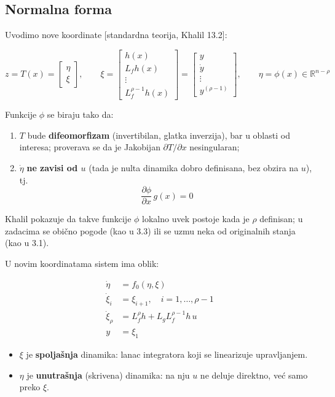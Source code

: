 \documentclass[11pt,a4paper,parskip=half,headsepline,numbers=noenddot]{scrartcl}
\DeclareRobustCommand{\izvor}[1]{{\small\color{izvorC}[#1]}}
\begin{document}
\subsection{Normalna forma}

Uvodimo nove koordinate \izvor{standardna teorija, Khalil 13.2}:

\[z = T(x) = \begin{bmatrix} \eta \\ \xi \end{bmatrix}, \qquad \xi = \begin{bmatrix} h(x) \\ L_fh(x) \\ \vdots \\ L_f^{\rho-1}h(x) \end{bmatrix} = \begin{bmatrix} y \\ \dot y \\ \vdots \\ y^{(\rho-1)} \end{bmatrix}, \qquad \eta = \phi(x) \in \mathbb{R}^{n-\rho}\]

Funkcije \(\phi\) se biraju tako da:

\begin{enumerate}
\def\labelenumi{\arabic{enumi}.}
\item \(T\) bude \textbf{difeomorfizam} (invertibilan, glatka inverzija), bar u oblasti od interesa; proverava se da je Jakobijan \(\partial T/\partial x\) nesingularan;
\item \(\dot\eta\) \textbf{ne zavisi od \(u\)} (tada je nulta dinamika dobro definisana, bez obzira na \(u\)), tj.
  \[\frac{\partial\phi}{\partial x}\,g(x) = 0\]
\end{enumerate}

Khalil pokazuje da takve funkcije \(\phi\) lokalno uvek postoje kada je \(\rho\) definisan; u zadacima se obično pogode (kao u 3.3) ili se uzmu neka od originalnih stanja (kao u 3.1).

U novim koordinatama sistem ima oblik:

\[
\begin{aligned}
\dot\eta &= f_0(\eta, \xi) \\
\dot\xi_i &= \xi_{i+1}, \quad i = 1, \dots, \rho - 1 \\
\dot\xi_\rho &= L_f^\rho h + L_gL_f^{\rho-1}h\,u \\
y &= \xi_1
\end{aligned}
\]

\begin{itemize}
\item \(\xi\) je \textbf{spoljašnja} dinamika: lanac integratora koji se linearizuje upravljanjem.
\item \(\eta\) je \textbf{unutrašnja} (skrivena) dinamika: na nju \(u\) ne deluje direktno, već samo preko \(\xi\).
\end{itemize}
\end{document}
